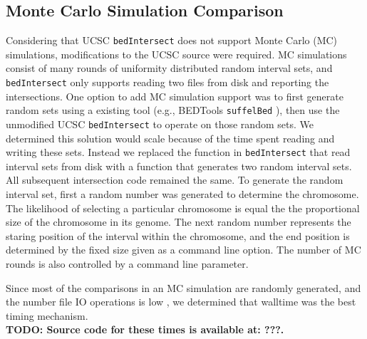 \subsection{Monte Carlo Simulation Comparison}
Considering that UCSC {\tt bedIntersect} does not support Monte Carlo (MC)
simulations, modifications to the UCSC source were required.  MC simulations
consist of many rounds of uniformity distributed random interval sets, and
{\tt bedIntersect} only supports reading two files from disk and reporting the
intersections.  One option to add MC simulation support was to first generate
random sets using a existing tool (e.g., BEDTools {\tt suffelBed} ), then use
the unmodified UCSC {\tt bedIntersect} to operate on those random sets.  We
determined this solution would scale because of the time spent reading and
writing these sets.  Instead we replaced the function in {\tt bedIntersect} that
read interval sets from disk with a function that generates two random interval
sets.  All subsequent intersection code remained the same.  To generate the
random interval set, first a random number was generated to determine the
chromosome.  The likelihood of selecting a particular chromosome is equal the
the proportional size of the chromosome in its genome.  The next random number
represents the staring position of the interval within the chromosome, and the
end position is determined by the fixed size given as a command line option.
The number of MC rounds is also controlled by a command line parameter.

Since most of the comparisons in an MC simulation are randomly generated, and
the number file IO operations is low , we determined that walltime was the
best timing mechanism.\\
\textbf{TODO: Source code for these times is available at: ???.}
